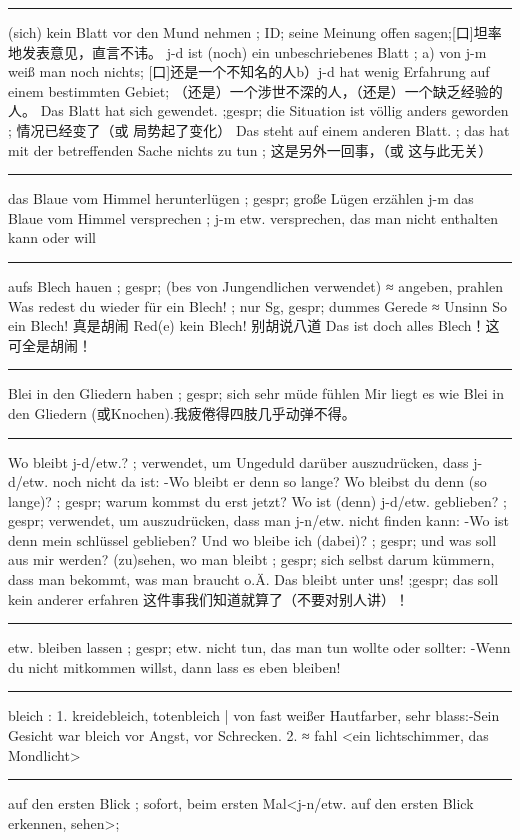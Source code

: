 \noindent\rule{\textwidth}{1pt}
(sich) kein Blatt vor den Mund nehmen ; ID; seine Meinung offen sagen;[口]坦率地发表意见，直言不讳。
j-d ist (noch) ein unbeschriebenes Blatt ; a) von j-m weiß man noch nichts; [口]还是一个不知名的人b）j-d hat wenig Erfahrung auf einem bestimmten Gebiet; （还是）一个涉世不深的人，（还是）一个缺乏经验的人。
Das Blatt hat sich gewendet. ;gespr; die Situation ist völlig anders geworden ; 情况已经变了（或 局势起了变化）
Das steht auf einem anderen Blatt. ; das hat mit der betreffenden Sache nichts zu tun ; 这是另外一回事，（或 这与此无关）

\noindent\rule{\textwidth}{1pt}
das Blaue vom Himmel herunterlügen ; gespr; große Lügen erzählen 
j-m das Blaue vom Himmel versprechen ; j-m etw. versprechen, das man nicht enthalten kann oder will

\noindent\rule{\textwidth}{1pt}
aufs Blech hauen ; gespr; (bes von Jungendlichen verwendet) ≈ angeben, prahlen 
Was redest du wieder für ein Blech! ; nur Sg, gespr; dummes Gerede ≈ Unsinn
So ein Blech! 真是胡闹
Red(e) kein Blech! 别胡说八道
Das ist doch alles Blech！这可全是胡闹！

\noindent\rule{\textwidth}{1pt}
Blei in den Gliedern haben ; gespr; sich sehr müde fühlen
Mir liegt es wie Blei in den Gliedern (或Knochen).我疲倦得四肢几乎动弹不得。

\noindent\rule{\textwidth}{1pt}
Wo bleibt j-d/etw.? ; verwendet, um Ungeduld darüber auszudrücken, dass j-d/etw. noch nicht da ist:
-Wo bleibt er denn so lange?
Wo bleibst du denn (so lange)? ; gespr; warum kommst du erst jetzt?
Wo ist (denn) j-d/etw. geblieben? ; gespr; verwendet, um auszudrücken, dass man j-n/etw. nicht finden kann:
-Wo ist denn mein schlüssel geblieben?
Und wo bleibe ich (dabei)? ; gespr; und was soll aus mir werden?
(zu)sehen, wo man bleibt ; gespr; sich selbst darum kümmern, dass man bekommt, was man braucht o.Ä.
Das bleibt unter uns! ;gespr; das soll kein anderer erfahren 这件事我们知道就算了（不要对别人讲）！

\noindent\rule{\textwidth}{1pt} 
etw. bleiben lassen ; gespr; etw. nicht tun, das man tun wollte oder sollter: 
-Wenn du nicht mitkommen willst, dann lass es eben bleiben!

\noindent\rule{\textwidth}{1pt} 
bleich : 1. kreidebleich, totenbleich | von fast weißer Hautfarber, sehr blass:-Sein Gesicht war bleich vor Angst, vor Schrecken.
         2. ≈ fahl \textless ein lichtschimmer, das Mondlicht\textgreater 
         
\noindent\rule{\textwidth}{1pt} 
auf den ersten Blick ; sofort, beim ersten Mal\textless j-n/etw. auf den ersten Blick erkennen, sehen\textgreater ;

